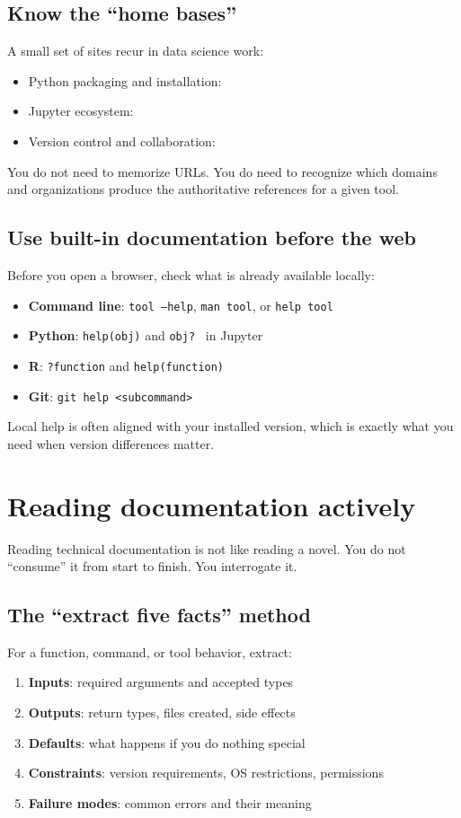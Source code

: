 \subsection{Know the “home bases”}
A small set of sites recur in data science work:
\begin{itemize}[noitemsep]
  \item Python packaging and installation: \cite{python_packaging_user_guide,pip_user_guide,conda_manage_environments}
  \item Jupyter ecosystem: \cite{project_jupyter_docs,jupyterlab_docs}
  \item Version control and collaboration: \cite{chacon2014progit}
\end{itemize}

You do not need to memorize URLs. You do need to recognize which domains and organizations produce the authoritative references for a given tool.

\subsection{Use built-in documentation before the web}
Before you open a browser, check what is already available locally:
\begin{itemize}[noitemsep]
  \item \textbf{Command line}: \texttt{tool --help}, \texttt{man tool}, or \texttt{help tool}
  \item \textbf{Python}: \texttt{help(obj)} and \texttt{obj?\ } in Jupyter
  \item \textbf{R}: \texttt{?function} and \texttt{help(function)}
  \item \textbf{Git}: \texttt{git help <subcommand>}
\end{itemize}

Local help is often aligned with your installed version, which is exactly what you need when version differences matter.

\section{Reading documentation actively}
Reading technical documentation is not like reading a novel. You do not “consume” it from start to finish. You interrogate it.

\subsection{The “extract five facts” method}
For a function, command, or tool behavior, extract:
\begin{enumerate}[noitemsep]
  \item \textbf{Inputs}: required arguments and accepted types
  \item \textbf{Outputs}: return types, files created, side effects
  \item \textbf{Defaults}: what happens if you do nothing special
  \item \textbf{Constraints}: version requirements, OS restrictions, permissions
  \item \textbf{Failure modes}: common errors and their meaning
\end{enumerate}

